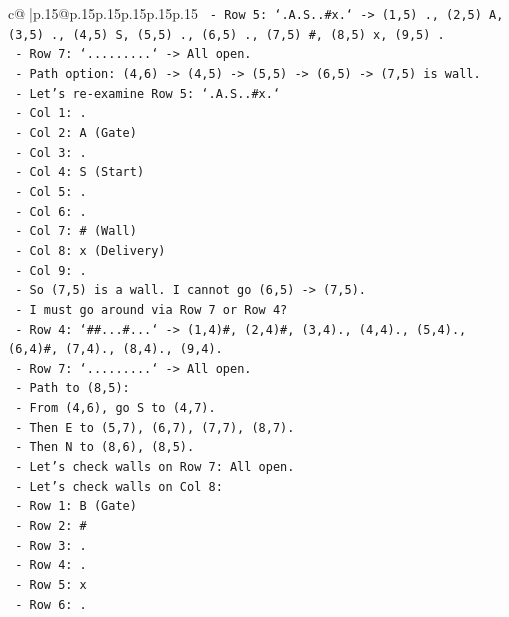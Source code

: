 \documentclass{article}
\begin{document}
{\begin{supertabular}{c@{$\;$}|p{.15\linewidth}@{}p{.15\linewidth}p{.15\linewidth}p{.15\linewidth}p{.15\linewidth}p{.15\linewidth}}
{{{\texttt{     {-} Row 5: `.A.S..\#x.` {-}> (1,5) ., (2,5) A, (3,5) ., (4,5) S, (5,5) ., (6,5) ., (7,5) \#, (8,5) x, (9,5) .} \\
\texttt{     {-} Row 7: `.........` {-}> All open.} \\
\texttt{     {-} Path option: (4,6) {-}> (4,5) {-}> (5,5) {-}> (6,5) {-}> (7,5) is wall.} \\
\texttt{     {-} Let's re{-}examine Row 5: `.A.S..\#x.`} \\
\texttt{       {-} Col 1: .} \\
\texttt{       {-} Col 2: A (Gate)} \\
\texttt{       {-} Col 3: .} \\
\texttt{       {-} Col 4: S (Start)} \\
\texttt{       {-} Col 5: .} \\
\texttt{       {-} Col 6: .} \\
\texttt{       {-} Col 7: \# (Wall)} \\
\texttt{       {-} Col 8: x (Delivery)} \\
\texttt{       {-} Col 9: .} \\
\texttt{     {-} So (7,5) is a wall. I cannot go (6,5) {-}> (7,5).} \\
\texttt{     {-} I must go around via Row 7 or Row 4?} \\
\texttt{     {-} Row 4: `\#\#...\#...` {-}> (1,4)\#, (2,4)\#, (3,4)., (4,4)., (5,4)., (6,4)\#, (7,4)., (8,4)., (9,4).} \\
\texttt{     {-} Row 7: `.........` {-}> All open.} \\
\texttt{     {-} Path to (8,5):} \\
\texttt{       {-} From (4,6), go S to (4,7).} \\
\texttt{       {-} Then E to (5,7), (6,7), (7,7), (8,7).} \\
\texttt{       {-} Then N to (8,6), (8,5).} \\
\texttt{       {-} Let's check walls on Row 7: All open.} \\
\texttt{       {-} Let's check walls on Col 8:} \\
\texttt{         {-} Row 1: B (Gate)} \\
\texttt{         {-} Row 2: \#} \\
\texttt{         {-} Row 3: .} \\
\texttt{         {-} Row 4: .} \\
\texttt{         {-} Row 5: x} \\
\texttt{         {-} Row 6: .} \\
}}}
\end{supertabular}}
\end{document}
